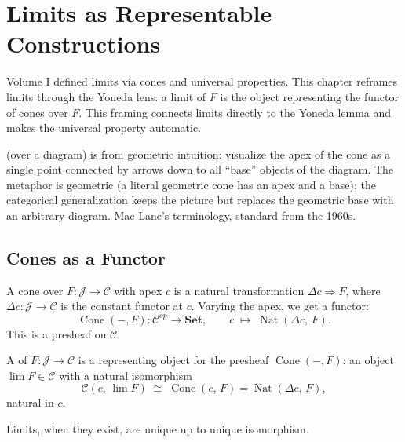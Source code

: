 
\chapter{Limits as Representable Constructions}

Volume I defined limits via cones and universal properties. This chapter
reframes limits through the Yoneda lens: a limit of $F$ is the object
representing the functor of cones over $F$. This framing connects limits
directly to the Yoneda lemma and makes the universal property automatic.

\begin{nameorigin}
 (over a diagram) is from geometric intuition: visualize the
apex of the cone as a single point connected by arrows down to all
``base'' objects of the diagram. The metaphor is geometric (a literal
geometric cone has an apex and a base); the categorical generalization
keeps the picture but replaces the geometric base with an arbitrary
diagram. Mac Lane's terminology, standard from the 1960s.
\end{nameorigin}

\section{Cones as a Functor}

A cone over $F : \mathcal{J} \to \mathcal{C}$ with apex $c$ is a natural
transformation $\Delta c \Rightarrow F$, where $\Delta c : \mathcal{J} \to \mathcal{C}$
is the constant functor at $c$. Varying the apex, we get a functor:
\[
  \operatorname{Cone}(-, F) : \mathcal{C}^{op} \to \mathbf{Set},
  \qquad
  c \;\mapsto\; \operatorname{Nat}(\Delta c,\, F).
\]
This is a presheaf on $\mathcal{C}$.

\begin{definition}
A  of $F : \mathcal{J} \to \mathcal{C}$ is a representing object
for the presheaf $\operatorname{Cone}(-,F)$: an object $\lim F \in \mathcal{C}$
with a natural isomorphism
\[
  \mathcal{C}(c,\, \lim F) \;\cong\; \operatorname{Cone}(c,\, F)
  = \operatorname{Nat}(\Delta c,\, F),
\]
natural in $c$.
\end{definition}

\begin{theorem}
Limits, when they exist, are unique up to unique isomorphism.
\end{theorem}

